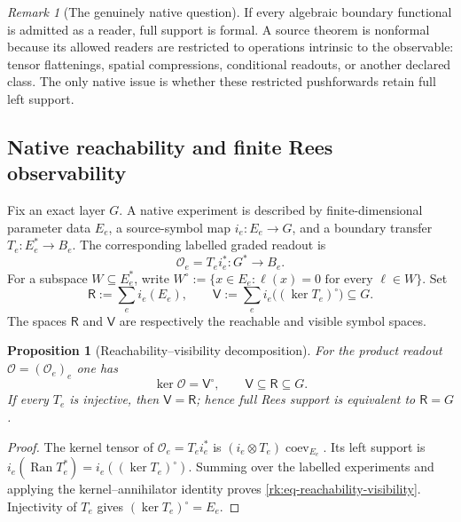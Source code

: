 \documentclass[10pt,reqno]{amsart}
\theoremstyle{plain}
\newtheorem{proposition}[theorem]{Proposition}
\theoremstyle{definition}
\theoremstyle{remark}
\newtheorem{remark}[theorem]{Remark}
\begin{document}
\begin{remark}[The genuinely native question]
If every algebraic boundary functional is admitted as a reader, full support
is formal.  A source theorem is nonformal because its allowed readers are
restricted to operations intrinsic to the observable: tensor flattenings,
spatial compressions, conditional readouts, or another declared class.  The
only native issue is whether these restricted pushforwards retain full left
support.
\end{remark}


\subsection{Native reachability and finite Rees observability}
\label{rk:subsec-reachability}
Fix an exact layer $G$.  A native experiment is described by finite-dimensional
parameter data $E_e$, a source-symbol map $i_e:E_e\to G$, and a boundary
transfer $T_e:E_e^*\to B_e$.  The corresponding labelled graded readout is
\begin{equation}
 \mathcal O_e=T_e i_e^*:G^*\longrightarrow B_e.
 \label{rk:eq-native-experiment-factorization}
\end{equation}
For a subspace $W\subseteq E_e^*$, write
$W^\circ:=\{x\in E_e:\ell(x)=0\text{ for every }\ell\in W\}$.
Set
\[
 \mathsf R:=\sum_e i_e(E_e),\qquad
 \mathsf V:=\sum_e i_e\bigl((\ker T_e)^\circ\bigr)\subseteq G.
\]
The spaces $\mathsf R$ and $\mathsf V$ are respectively the reachable and
visible symbol spaces.

\begin{proposition}[Reachability--visibility decomposition]
\label{rk:prop-reachability-visibility}
For the product readout $\mathcal O=(\mathcal O_e)_e$ one has
\begin{equation}
 \ker\mathcal O=\mathsf V^\circ,
 \qquad
 \mathsf V\subseteq\mathsf R\subseteq G.
 \label{rk:eq-reachability-visibility}
\end{equation}
If every $T_e$ is injective, then $\mathsf V=\mathsf R$; hence full Rees
support is equivalent to $\mathsf R=G$.
\end{proposition}

\begin{proof}
The kernel tensor of $\mathcal O_e=T_ei_e^*$ is
$(i_e\otimes T_e)\operatorname{coev}_{E_e}$.  Its left support is
$i_e(\operatorname{Ran}T_e^*)=i_e((\ker T_e)^\circ)$.  Summing over the
labelled experiments and applying the kernel--annihilator identity proves
\eqref{rk:eq-reachability-visibility}.  Injectivity of $T_e$ gives
$(\ker T_e)^\circ=E_e$.
\end{proof}
\end{document}
